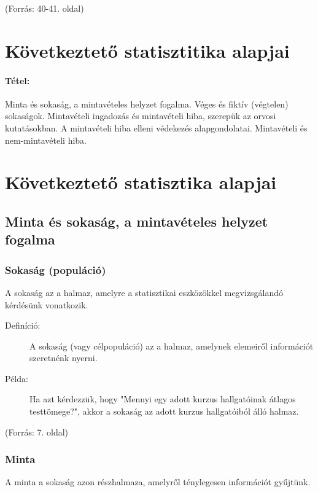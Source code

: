 \documentclass[a4paper,12pt]{article}
\begin{document}
    (Forrás: 40-41. oldal)

    \newpage


    \section{Következtető statisztitika alapjai}

    \paragraph{Tétel:} Minta és sokaság, a mintavételes helyzet fogalma. Véges és fiktív (végtelen) sokaságok.
    Mintavételi ingadozás és mintavételi hiba, szerepük az orvosi kutatásokban. A mintavételi hiba
    elleni védekezés alapgondolatai. Mintavételi és nem-mintavételi hiba.


    \section{Következtető statisztika alapjai}

    \subsection{Minta és sokaság, a mintavételes helyzet fogalma}

    \subsubsection{Sokaság (populáció)}

    A sokaság az a halmaz, amelyre a statisztikai eszközökkel megvizsgálandó kérdésünk vonatkozik.

    \begin{description}
        \item[Definíció:] A sokaság (vagy célpopuláció) az a halmaz, amelynek elemeiről információt szeretnénk nyerni.
        \item[Példa:] Ha azt kérdezzük, hogy "Mennyi egy adott kurzus hallgatóinak átlagos testtömege?", akkor a sokaság az adott kurzus hallgatóiból álló halmaz.
    \end{description}

    (Forrás: 7. oldal)

    \subsubsection{Minta}

    A minta a sokaság azon részhalmaza, amelyről ténylegesen információt gyűjtünk.
\end{document}
